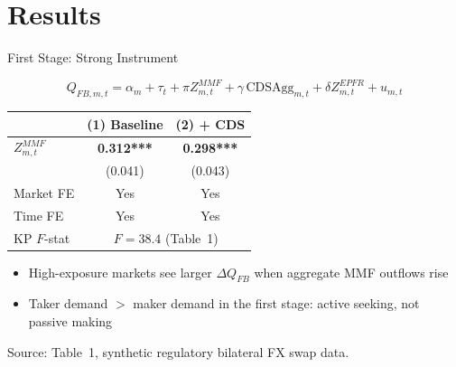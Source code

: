 \documentclass[aspectratio=169, 10pt]{beamer}
\begin{document}
\section{Results}

\begin{frame}{First Stage: Strong Instrument}

  \begin{equation*}
    Q_{FB,m,t} = \alpha_m + \tau_t + \pi Z_{m,t}^{MMF} +
    \gamma\,\text{CDSAgg}_{m,t} + \delta Z_{m,t}^{EPFR} + u_{m,t}
  \end{equation*}

  \bigskip

  \begin{center}
  \begin{tabular}{lcc}
    \toprule
    & (1) Baseline & (2) + CDS \\
    \midrule
    $Z_{m,t}^{MMF}$ & \textbf{0.312***} & \textbf{0.298***} \\
                   & (0.041) & (0.043) \\
    \midrule
    Market FE & Yes & Yes \\
    Time FE & Yes & Yes \\
    KP $F$-stat & \multicolumn{2}{c}{$F = 38.4$ (Table~1)} \\
    \bottomrule
  \end{tabular}
  \end{center}

  \bigskip

  \begin{itemize}
    \item High-exposure markets see larger $\Delta Q_{FB}$ when aggregate MMF outflows rise
    \item Taker demand $>$ maker demand in the first stage: active seeking, not passive making
  \end{itemize}

  {\color{dimgray}\small Source: Table~1, synthetic regulatory bilateral FX swap data.}

\end{frame}
\end{document}
